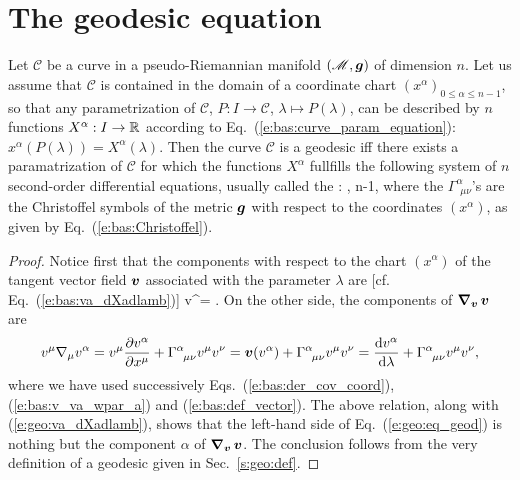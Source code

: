 \section{The geodesic equation}

\begin{greybox}
Let $\mathcal{C}$ be a curve in a pseudo-Riemannian
manifold $(\mathscr{M},\bm{g})$ of dimension $n$. Let us assume that
$\mathcal{C}$ is contained in the domain of a coordinate chart $(x^\alpha)_{0\leq\alpha\leq n-1}$,
so that any parametrization of $\mathcal{C}$, $P: I \to  \mathcal{C}$, $\lambda\mapsto P(\lambda)$,
can be described by $n$ functions $X^\alpha: I\to \mathbb{R}$
according to Eq.~(\ref{e:bas:curve_param_equation}): $x^\alpha(P(\lambda)) = X^\alpha(\lambda)$.
Then the curve $\mathcal{C}$ is a geodesic iff there exists a paramatrization of $\mathcal{C}$
for which the functions $X^\alpha$ fullfills the following
system of $n$ second-order differential equations, usually called the
:
\be \label{e:geo:eq_geod}
    ,   \leq \alpha \leq n-1,
\ee
where the $\Gamma^\alpha_{\ \, \mu \nu}$'s are the Christoffel symbols of the metric $\bm{g}$
with respect to the coordinates $(x^\alpha)$, as given by Eq.~(\ref{e:bas:Christoffel}).
\end{greybox}
\begin{proof}
Notice first that the components with respect
to the chart $(x^\alpha)$ of the tangent
vector field $\bm{v}$ associated with the parameter $\lambda$ are [cf. Eq.~(\ref{e:bas:va_dXadlamb})]
\be \label{e:geo:va_dXadlamb}
    v^\alpha =  .
\ee
On the other side, the components of $\bm{\nabla}_{\bm{v}}\,\bm{v}$ are
\[
    v^\mu \nabla_\mu v^\alpha = v^\mu \frac{\partial v^\alpha}{\partial x^\mu} + \Gamma^\alpha_{\ \, \mu \nu} v^\mu v^\nu
    = \bm{v}(v^\alpha) + \Gamma^\alpha_{\ \, \mu \nu} v^\mu v^\nu
    = \frac{\mathrm{d} v^\alpha}{\mathrm{d} \lambda} + \Gamma^\alpha_{\ \, \mu \nu} v^\mu v^\nu ,
\]
where we have used
successively Eqs.~(\ref{e:bas:der_cov_coord}), (\ref{e:bas:v_va_wpar_a}) and
(\ref{e:bas:def_vector}). The above relation, along with (\ref{e:geo:va_dXadlamb}),
shows that the left-hand side of
Eq.~(\ref{e:geo:eq_geod}) is nothing but the component $\alpha$ of
$\bm{\nabla}_{\bm{v}}\,\bm{v}$. The conclusion follows from the very definition
of a geodesic given in Sec.~\ref{s:geo:def}.
\end{proof}

